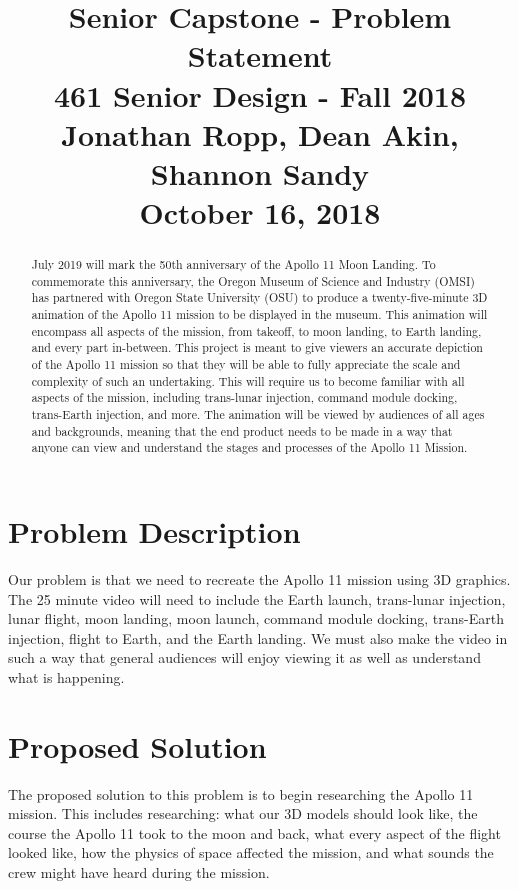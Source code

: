 \documentclass[onecolumn, draftclsnofoot,10pt, compsoc]{IEEEtran}
\begin{document}
\title{Senior Capstone - Problem Statement\\
	\large 461 Senior Design - Fall 2018\\
	\large Jonathan Ropp, Dean Akin, Shannon Sandy\\
	\large October 16, 2018}

\maketitle

\begin{abstract}

July 2019 will mark the 50th anniversary of the Apollo 11 Moon Landing. To commemorate this anniversary, the Oregon Museum of Science and Industry (OMSI) has partnered with Oregon State University (OSU) to produce a twenty-five-minute 3D animation of the Apollo 11 mission to be displayed in the museum. This animation will encompass all aspects of the mission, from takeoff, to moon landing, to Earth landing, and every part in-between. This project is meant to give viewers an accurate depiction of the Apollo 11 mission so that they will be able to fully appreciate the scale and complexity of such an undertaking. This will require us to become familiar with all aspects of the mission, including trans-lunar injection, command module docking, trans-Earth injection, and more. The animation will be viewed by audiences of all ages and backgrounds, meaning that the end product needs to be made in a way that anyone can view and understand the stages and processes of the Apollo 11 Mission.

\end{abstract}

\section{Problem Description}
Our problem is that we need to recreate the Apollo 11 mission using 3D graphics. The 25 minute video will need to include the Earth launch, trans-lunar injection, lunar flight, moon landing, moon launch, command module docking, trans-Earth injection, flight to Earth, and the Earth landing. We must also make the video in such a way that general audiences will enjoy viewing it as well as understand what is happening.
\section{Proposed Solution}
The proposed solution to this problem is to begin researching the Apollo 11 mission. This includes researching: what our 3D models should look like, the course the Apollo 11 took to the moon and back, what every aspect of the flight looked like, how the physics of space affected the mission, and what sounds the crew might have heard during the mission.
\end{document}

